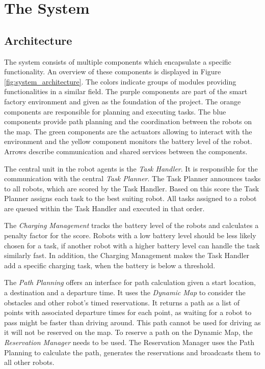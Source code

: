 \documentclass[journal]{IEEEtran}
\begin{document}
\section{The System}
\label{sec:system}


\subsection{Architecture}
\label{subsec:architecture}
The system consists of multiple components which encapsulate a specific functionality. An overview of these components is displayed in Figure \ref{fig:system_architecture}. The colors indicate groups of modules providing functionalities in a similar field. The purple components are part of the smart factory environment and given as the foundation of the project. The orange components are responsible for planning and executing tasks. The blue components provide path planning and the coordination between the robots on the map. The green components are the actuators allowing to interact with the environment and the yellow component monitors the battery level of the robot. Arrows describe communication and shared services between the components.

The central unit in the robot agents is the \emph{Task Handler}. It is responsible for the communication with the central \emph{Task Planner}. The Task Planner announces tasks to all robots, which are scored by the Task Handler. Based on this score the Task Planner assigns each task to the best suiting robot. All tasks assigned to a robot are queued within the Task Handler and executed in that order.

The \emph{Charging Management} tracks the battery level of the robots and calculates a penalty factor for the score. Robots with a low battery level should be less likely chosen for a task, if another robot with a higher battery level can handle the task similarly fast. In addition, the Charging Management makes the Task Handler add a specific charging task, when the battery is below a threshold.

The \emph{Path Planning} offers an interface for path calculation given a start location, a destination and a departure time. It uses the \emph{Dynamic Map} to consider the obstacles and other robot's timed reservations. It returns a path as a list of points with associated departure times for each point, as waiting for a robot to pass might be faster than driving around. This path cannot be used for driving as it will not be reserved on the map. To reserve a path on the Dynamic Map, the \emph{Reservation Manager} needs to be used. The Reservation Manager uses the Path Planning to calculate the path, generates the reservations and broadcasts them to all other robots.
\end{document}
